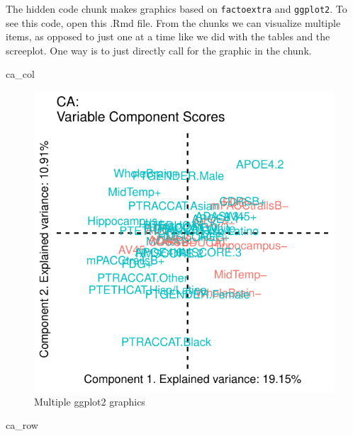 \documentclass[]{article}
\newenvironment{Shaded}{\begin{snugshade}}{\end{snugshade}}
\newcommand{\NormalTok}[1]{#1}
\begin{document}
The hidden code chunk makes graphics based on \texttt{factoextra} and
\texttt{ggplot2}. To see this code, open this .Rmd file. From the chunks
we can visualize multiple items, as opposed to just one at a time like
we did with the tables and the screeplot. One way is to just directly
call for the graphic in the chunk.

\begin{Shaded}
\begin{Highlighting}[]
\NormalTok{ca_col}
\end{Highlighting}
\end{Shaded}

\begin{figure}[H]

{\centering \includegraphics{1_a_Simple_RMarkdown_PDF_files/figure-latex/unnamed-chunk-1-1} 

}

\caption{Multiple ggplot2 graphics}\label{fig:unnamed-chunk-11}
\end{figure}

\begin{Shaded}
\begin{Highlighting}[]
\NormalTok{ca_row}
\end{Highlighting}
\end{Shaded}
\end{document}

